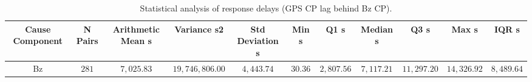 \vspace{-3pt}
\begin{table}[H]
\caption{Statistical analysis of response delays (GPS CP lag behind Bz CP).\label{tab:Response_Delay_Summary_Statistics_300_Bz}}
\begin{tabularx}{\textwidth}{CCCCCCCCCCC}
\toprule
\textbf{Cause Component} & \textbf{N Pairs} & \textbf{Arithmetic Mean s} & \textbf{Variance s2} & \textbf{Std Deviation s} & \textbf{Min s} & \textbf{Q1 s} & \textbf{Median s} & \textbf{Q3 s} & \textbf{Max s} & \textbf{IQR s} \\
\midrule
Bz & $281$ & $7,025.83$ & $19,746,806.00$ & $4,443.74$ & $30.36$ & $2,807.56$ & $7,117.21$ & $11,297.20$ & $14,326.92$ & $8,489.64$ \\
\bottomrule
\end{tabularx}
\end{table}
\vspace{-3pt}
